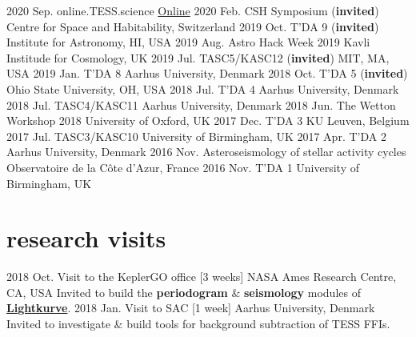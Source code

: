 \documentclass[letterpaper]{k-cv} %
\begin{document}
\begin{entrylist}
\entrythree
{2020 Sep.}
{online.TESS.science}
{\href{https://online.tess.science/}{Online}}
\entrythree
{2020 Feb.}
{CSH Symposium (\textbf{\textcolor{c2}{invited}})}
{Centre for Space and Habitability, Switzerland}
\entrythree
{2019 Oct.}
{T'DA 9 (\textbf{\textcolor{c2}{invited}})}
{Institute for Astronomy, HI, USA}
\entrythree
{2019 Aug.}
{Astro Hack Week 2019}
{Kavli Institude for Cosmology, UK}
\entrythree
{2019 Jul.}
{TASC5/KASC12  (\textbf{\textcolor{c2}{invited}})}
{MIT, MA, USA}
\entrythree
{2019 Jan.}
{T'DA 8}
{Aarhus University, Denmark}
\entrythree
{2018 Oct.}
{T'DA 5 (\textbf{\textcolor{c2}{invited}})}
{Ohio State University, OH, USA}
\entrythree
{2018 Jul.}
{T'DA 4}
{Aarhus University, Denmark}
\entrythree
{2018 Jul.}
{TASC4/KASC11}
{Aarhus University, Denmark}
\entrythree
{2018 Jun.}
{The Wetton Workshop 2018}
{University of Oxford, UK}
\entrythree
{2017 Dec.}
{T'DA 3}
{KU Leuven, Belgium}
\entrythree
{2017 Jul.}
{TASC3/KASC10}
{University of Birmingham, UK}
\entrythree
{2017 Apr.}
{T'DA 2}
{Aarhus University, Denmark}
\entrythree
{2016 Nov.}
{Asteroseismology of stellar activity cycles}
{Observatoire de la C\^{o}te d'Azur, France}
\entrythree
{2016 Nov.}
{T'DA 1}
{University of Birmingham, UK}
\end{entrylist}


\section{\color{c3}research visits}
\begin{entrylist}
\entry
{2018 Oct.}
{Visit to the KeplerGO office [3 weeks]}
{NASA Ames Research Centre, CA, USA}
{Invited to build the \textbf{\textcolor{c3}{periodogram}} \&  \textbf{\textcolor{c3}{seismology}} modules of \textbf{\textcolor{c3}{\href{http://docs.lightkurve.org/}{Lightkurve}}}.}
\entry
{2018 Jan.}
{Visit to SAC [1 week]}
{Aarhus University, Denmark}
{Invited to investigate \& build tools for background subtraction of TESS FFIs.}
\end{entrylist}
\end{document}
